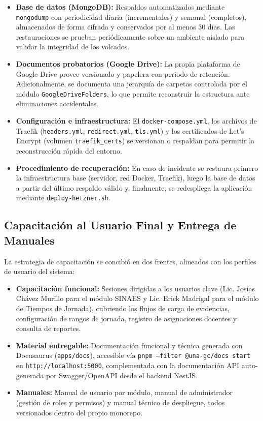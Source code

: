 \begin{itemize}
    \item \textbf{Base de datos (MongoDB):} Respaldos automatizados mediante \texttt{mongodump} con periodicidad diaria (incrementales) y semanal (completos), almacenados de forma cifrada y conservados por al menos 30 días. Las restauraciones se prueban periódicamente sobre un ambiente aislado para validar la integridad de los volcados.
    \item \textbf{Documentos probatorios (Google Drive):} La propia plataforma de Google Drive provee versionado y papelera con periodo de retención. Adicionalmente, se documenta una jerarquía de carpetas controlada por el módulo \texttt{GoogleDriveFolders}, lo que permite reconstruir la estructura ante eliminaciones accidentales.
    \item \textbf{Configuración e infraestructura:} El \texttt{docker-compose.yml}, los archivos de Traefik (\texttt{headers.yml}, \texttt{redirect.yml}, \texttt{tls.yml}) y los certificados de Let's Encrypt (volumen \texttt{traefik\_certs}) se versionan o respaldan para permitir la reconstrucción rápida del entorno.
    \item \textbf{Procedimiento de recuperación:} En caso de incidente se restaura primero la infraestructura base (servidor, red Docker, Traefik), luego la base de datos a partir del último respaldo válido y, finalmente, se redespliega la aplicación mediante \texttt{deploy-hetzner.sh}.
\end{itemize}

\subsection{Capacitación al Usuario Final y Entrega de Manuales}

La estrategia de capacitación se concibió en dos frentes, alineados con los perfiles de usuario del sistema:

\begin{itemize}
    \item \textbf{Capacitación funcional:} Sesiones dirigidas a los usuarios clave (Lic. Josías Chávez Murillo para el módulo SINAES y Lic. Erick Madrigal para el módulo de Tiempos de Jornada), cubriendo los flujos de carga de evidencias, configuración de rangos de jornada, registro de asignaciones docentes y consulta de reportes.
    \item \textbf{Material entregable:} Documentación funcional y técnica generada con Docusaurus (\texttt{apps/docs}), accesible vía \texttt{pnpm --filter @una-gc/docs start} en \texttt{http://localhost:5000}, complementada con la documentación API auto-generada por Swagger/OpenAPI desde el backend NestJS.
    \item \textbf{Manuales:} Manual de usuario por módulo, manual de administrador (gestión de roles y permisos) y manual técnico de despliegue, todos versionados dentro del propio monorepo.
\end{itemize}

